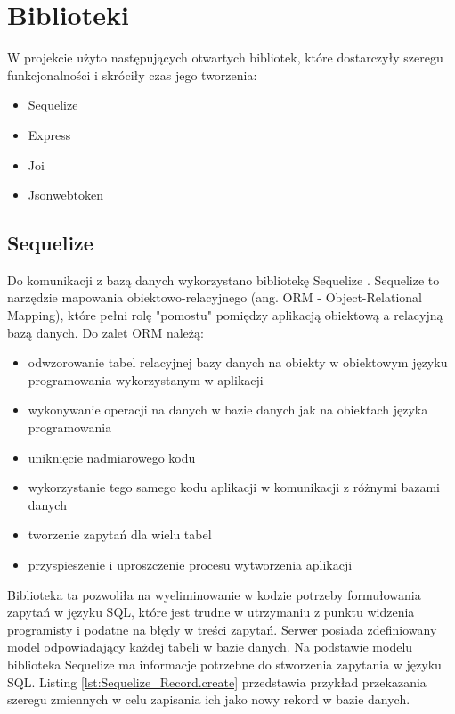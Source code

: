 \documentclass{sprz}
\begin{document}
\section{Biblioteki}

W projekcie użyto następujących otwartych bibliotek, które dostarczyły szeregu funkcjonalności i skróciły czas jego tworzenia:
\begin{itemize}
  \item Sequelize
  \item Express
  \item Joi
  \item Jsonwebtoken
\end{itemize}

\subsection*{Sequelize}

Do komunikacji z bazą danych wykorzystano bibliotekę Sequelize \cite{sequelize}. Sequelize to narzędzie mapowania obiektowo-relacyjnego (ang. ORM - Object-Relational Mapping), które pełni rolę "pomostu" pomiędzy aplikacją obiektową a relacyjną bazą danych.
Do zalet ORM należą:
\begin{itemize}
  \item odwzorowanie tabel relacyjnej bazy danych na obiekty w obiektowym języku programowania wykorzystanym w aplikacji
  \item wykonywanie operacji na danych w bazie danych jak na obiektach języka programowania
  \item uniknięcie nadmiarowego kodu
  \item wykorzystanie tego samego kodu aplikacji w komunikacji z różnymi bazami danych
  \item tworzenie zapytań dla wielu tabel
  \item przyspieszenie i uproszczenie procesu wytworzenia aplikacji
\end{itemize}

Biblioteka ta pozwoliła na wyeliminowanie w kodzie potrzeby formułowania zapytań w języku SQL, które jest trudne w utrzymaniu z punktu widzenia programisty i podatne na błędy w treści zapytań. Serwer posiada zdefiniowany model odpowiadający każdej tabeli w bazie danych. Na podstawie modelu biblioteka Sequelize ma informacje potrzebne do stworzenia zapytania w języku SQL. Listing \ref{lst:Sequelize_Record.create} przedstawia przykład przekazania szeregu zmiennych w celu zapisania ich jako nowy rekord w bazie danych.
\end{document}
